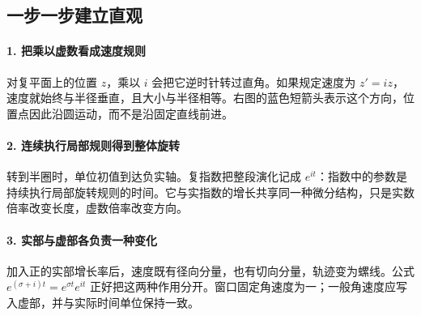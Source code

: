 \subsection*{一步一步建立直观}

\paragraph{1. 把乘以虚数看成速度规则}

对复平面上的位置 $z$，乘以 $i$ 会把它逆时针转过直角。如果规定速度为 $z'=iz$，速度就始终与半径垂直，且大小与半径相等。右图的蓝色短箭头表示这个方向，位置点因此沿圆运动，而不是沿固定直线前进。



\paragraph{2. 连续执行局部规则得到整体旋转}

转到半圈时，单位初值到达负实轴。复指数把整段演化记成 $e^{it}$：指数中的参数是持续执行局部旋转规则的时间。它与实指数的增长共享同一种微分结构，只是实数倍率改变长度，虚数倍率改变方向。



\paragraph{3. 实部与虚部各负责一种变化}

加入正的实部增长率后，速度既有径向分量，也有切向分量，轨迹变为螺线。公式 $e^{(\sigma+i)t}=e^{\sigma t}e^{it}$ 正好把这两种作用分开。窗口固定角速度为一；一般角速度应写入虚部，并与实际时间单位保持一致。
